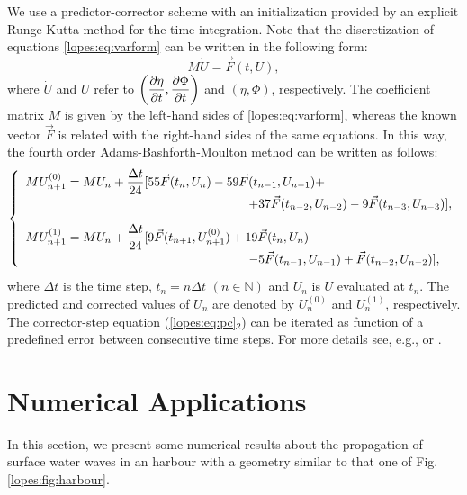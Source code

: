 We use
a predictor-corrector   scheme with an initialization
provided by an explicit Runge-Kutta method for the
time integration.
Note that the discretization of
equations \eqref{lopes:eq:varform} can be written in the following form:
\begin{equation}
M\dot U={\vec{F}}(t,U),
\end{equation}
where \(\dot U\) and \(U\) refer
to \(\displaystyle \left(\frac{\partial \eta}{\partial t},\frac{\partial \Phi}{\partial t}\right)\)
and  \((\eta,\Phi)\), respectively.
The  coefficient matrix \(M\) is given by the left-hand
sides of \eqref{lopes:eq:varform}, whereas
the  known vector \(\vec{F}\) is  related
with the right-hand sides of the same equations.
In this way,  the fourth order  Adams-Bashforth-Moulton method
can be written as follows:
\begin{equation}\label{lopes:eq:pc}
\renewcommand{\arraystretch}{1.3}
\left\{
\begin{array}{l}
\displaystyle MU^{(0)}_{n+1}=MU_n+\frac{\Delta
t}{24}[55{\vec{F}}(t_n,U_n)-59{\vec{F}}(t_{n-1},U_{n-1})+\\
\hspace{2.5in}+37{\vec{F}}(t_{n-2},U_{n-2})-9{\vec{F}}(t_{n-3},U_{n-3})],
\vspace{0.3cm}\\
\displaystyle MU^{(1)}_{n+1}=MU_n+\frac{\Delta
t}{24}[9{\vec{F}}(t_{n+1},U^{(0)}_{n+1})+19{\vec{F}}(t_n,U_n)-\\
\hspace{2.5in}-5{\vec{F}}(t_{n-1},U_{n-1})+{\vec{F}}(t_{n-2},U_{n-2})],
\end{array}
\right.
\end{equation}
where \(\Delta t\) is the time step, \(t_n=n\Delta
  t\) \((n\in \mathbb{N})\) and \(U_n\) is \(U\)
  evaluated at \(t_n\).
  The predicted and
corrected values of \(U_n\) are denoted by \(U_n^{(0)}\) and \(U_n^{(1)}\),  respectively.
The corrector-step equation (\eqref{lopes:eq:pc}\(_{2}\)) can
be iterated as  function of a predefined error
between consecutive time steps. For more details see, e.g.,  \cite{HairerWanner1991a}
or \cite{Lambert1991}.



\section{Numerical Applications}
In this section,
we present some numerical results about the propagation
 of surface water waves in an harbour with a geometry
similar to that one of  Fig. \ref{lopes:fig:harbour}.

